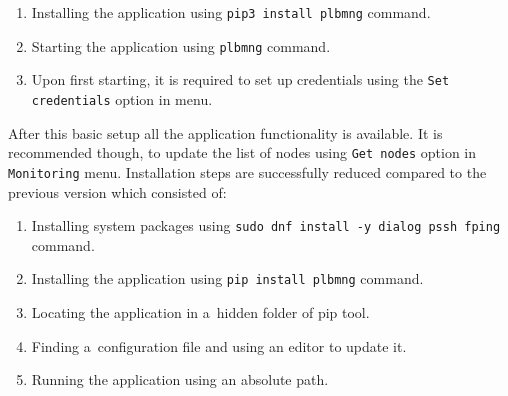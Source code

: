 {{{{{{{\begin{enumerate}
	\item Installing the application using \texttt{pip3 install plbmng} command.
	\item Starting the application using \texttt{plbmng} command.
	\item Upon first starting, it is required to set up credentials using the \texttt{Set credentials} option in menu.
\end{enumerate}

After this basic setup all the application functionality is available. It is recommended though, to update the list of nodes using \texttt{Get nodes} option in \texttt{Monitoring} menu. Installation steps are successfully reduced compared to the previous version which consisted of:

\begin{enumerate}
	\item Installing system packages using \texttt{sudo dnf install -y dialog pssh fping} command.
	\item Installing the application using \texttt{pip install plbmng} command.
	\item Locating the application in a~hidden folder of pip tool.
	\item Finding a~configuration file and using an editor to update it.
	\item Running the application using an absolute path.
\end{enumerate}

}}}}}}}
